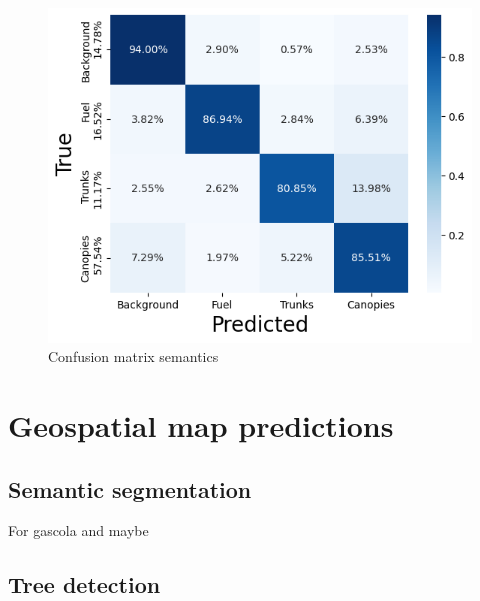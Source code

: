 \begin{figure}
    \centering
    \includegraphics[width=\textwidth]{figs/results/confusion_matrix.png}
    \caption{Confusion matrix semantics}
    \label{fig:res_confusion_matrix}
\end{figure}

\section{Geospatial map predictions}
\subsection{Semantic segmentation}
For gascola and maybe 
\subsection{Tree detection}

